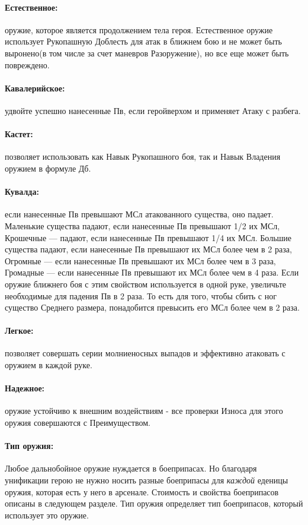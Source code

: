 \paragraph{Естественное:} оружие, которое является продолжением тела героя. Естественное оружие использует Рукопашную Доблесть для атак в ближнем бою и не может быть выронено(в том числе за счет маневров Разоружение), но все еще может быть повреждено.
\paragraph{Кавалерийское:} удвойте успешно нанесенные Пв, если геройверхом и применяет Атаку с разбега.
\paragraph{Кастет:} позволяет использовать как Навык Рукопашного боя, так и Навык Владения оружием в формуле Дб.
\paragraph{Кувалда:} если нанесенные Пв превышают МСл атакованного существа, оно падает. 
\newline
Маленькие существа падают, если нанесенные Пв превышают 1/2 их МСл, Крошечные — падают, если нанесенные Пв превышают 1/4 их МСл.
\newline
Большие существа падают, если нанесенные Пв превышают их МСл более чем в 2 раза, Огромные — если нанесенные Пв превышают их МСл более чем в 3 раза, Громадные — если нанесенные Пв превышают их МСл более чем в 4 раза.
\newline
Если оружие ближнего боя с этим свойством используется в одной руке, увеличьте необходимые для падения Пв в 2 раза. То есть для того, чтобы сбить с ног существо Среднего размера, понадобится превысить его МСл более чем в 2 раза.
\paragraph{Легкое:} позволяет совершать серии молниеносных выпадов и эффективно атаковать с оружием в каждой руке.
\paragraph{Надежное:} оружие устойчиво к внешним воздействиям - все проверки Износа для этого оружия совершаются с Преимуществом.
\paragraph{Тип оружия:} Любое дальнобойное оружие нуждается в боеприпасах. Но благодаря унификации герою не нужно носить разные боеприпасы для \textit{каждой} еденицы оружия, которая есть у него в арсенале. Стоимость и свойства боеприпасов описаны в следующем разделе. Тип оружия определяет тип боеприпасов, который использует это оружие.
